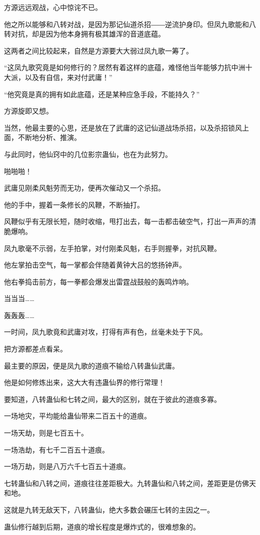 \begin{this_body}
方源远远观战，心中惊诧不已。

他之所以能够和八转对战，是因为那记仙道杀招――逆流护身印。但凤九歌能和八转对抗，却是因为他本身拥有极其雄浑的音道底蕴。

这两者之间比较起来，自然是方源要大大弱过凤九歌一筹了。

“这凤九歌究竟是如何修行的？居然有着这样的底蕴，难怪他当年能够力抗中洲十大派，以及有自信，来对付武庸！”

“他究竟是真的拥有如此底蕴，还是某种应急手段，不能持久？”

方源旋即又想。

当然，他最主要的心思，还是放在了武庸的这记仙道战场杀招，以及杀招锁风上面，不断地分析、推演。

与此同时，他仙窍中的几位影宗蛊仙，也在为此努力。

啪啪啪！

武庸见刚柔风魁劳而无功，便再次催动又一个杀招。

他的手中，握着一条修长的风鞭，不断抽打。

风鞭似乎有无限长短，随时收缩，甩打出去，每一击都击破空气，打出一声声的清脆爆响。

凤九歌毫不示弱，左手拍掌，对付刚柔风魁，右手则握拳，对抗风鞭。

他左掌拍击空气，每一掌都会伴随着黄钟大吕的悠扬钟声。

他右拳捣击前方，每一拳都会爆发出雷霆战鼓般的轰鸣炸响。

当当当……

轰轰轰……

一时间，凤九歌竟和武庸对攻，打得有声有色，丝毫未处于下风。

把方源都差点看呆。

最主要的原因，便是凤九歌的道痕不输给八转蛊仙武庸。

他是如何修炼出来，这大大有违蛊仙界的修行常理！

要知道，八转蛊仙和七转之间，最大的区别，就在于彼此的道痕多寡。

一场地灾，平均能给蛊仙带来二百五十的道痕。

一场天劫，则是七百五十。

一场浩劫，有七千二百五十道痕。

一场万劫，则是八万六千七百五十道痕。

七转蛊仙和八转之间，道痕往往差距极大。九转蛊仙和八转之间，差距更是仿佛天和地。

这就是九转无敌天下，八转蛊仙，绝大多数会碾压七转的主因之一。

蛊仙修行越到后期，道痕的增长程度是爆炸式的，很难想象的。


\end{this_body}
